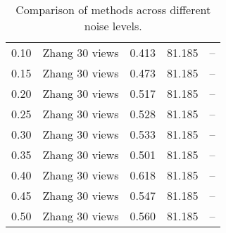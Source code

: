 \begin{table}[H]
\begin{tabular}{l c l l l}
0.10 & Zhang 30 views & 0.413 & 81.185 & -- \\
0.15 & Zhang 30 views & 0.473 & 81.185 & -- \\
0.20 & Zhang 30 views & 0.517 & 81.185 & -- \\
0.25 & Zhang 30 views & 0.528 & 81.185 & -- \\
0.30 & Zhang 30 views & 0.533 & 81.185 & -- \\
0.35 & Zhang 30 views & 0.501 & 81.185 & -- \\
0.40 & Zhang 30 views & 0.618 & 81.185 & -- \\
0.45 & Zhang 30 views & 0.547 & 81.185 & -- \\
0.50 & Zhang 30 views & 0.560 & 81.185 & -- \\
\midrule
\bottomrule
\end{tabular}
\label{tab:compares}
\caption{Comparison of methods across different noise levels.}
\end{table}
